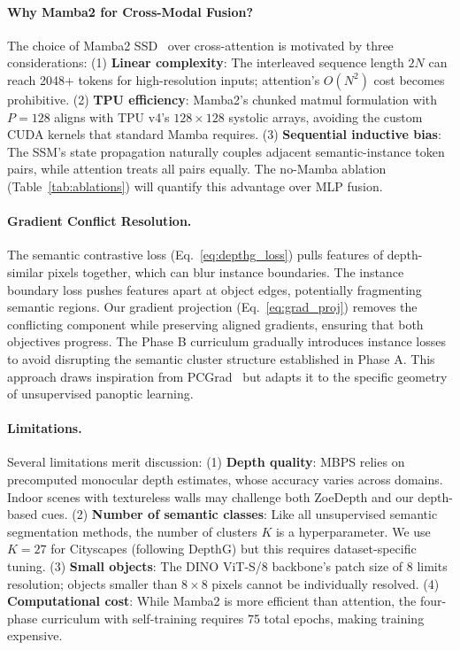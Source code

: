 \documentclass{article}
\begin{document}
\paragraph{Why Mamba2 for Cross-Modal Fusion?}
The choice of Mamba2 SSD~\cite{dao2024mamba2} over cross-attention is motivated by three considerations: (1) \textbf{Linear complexity}: The interleaved sequence length $2N$ can reach 2048+ tokens for high-resolution inputs; attention's $O(N^2)$ cost becomes prohibitive. (2) \textbf{TPU efficiency}: Mamba2's chunked matmul formulation with $P = 128$ aligns with TPU v4's $128 \times 128$ systolic arrays, avoiding the custom CUDA kernels that standard Mamba requires. (3) \textbf{Sequential inductive bias}: The SSM's state propagation naturally couples adjacent semantic-instance token pairs, while attention treats all pairs equally. The no-Mamba ablation (Table~\ref{tab:ablations}) will quantify this advantage over MLP fusion.

\paragraph{Gradient Conflict Resolution.}
The semantic contrastive loss (Eq.~\ref{eq:depthg_loss}) pulls features of depth-similar pixels together, which can blur instance boundaries. The instance boundary loss pushes features apart at object edges, potentially fragmenting semantic regions. Our gradient projection (Eq.~\ref{eq:grad_proj}) removes the conflicting component while preserving aligned gradients, ensuring that both objectives progress. The Phase B curriculum gradually introduces instance losses to avoid disrupting the semantic cluster structure established in Phase A. This approach draws inspiration from PCGrad~\cite{yu2020pcgrad} but adapts it to the specific geometry of unsupervised panoptic learning.

\paragraph{Limitations.}
Several limitations merit discussion: (1) \textbf{Depth quality}: MBPS relies on precomputed monocular depth estimates, whose accuracy varies across domains. Indoor scenes with textureless walls may challenge both ZoeDepth and our depth-based cues. (2) \textbf{Number of semantic classes}: Like all unsupervised semantic segmentation methods, the number of clusters $K$ is a hyperparameter. We use $K = 27$ for Cityscapes (following DepthG) but this requires dataset-specific tuning. (3) \textbf{Small objects}: The DINO ViT-S/8 backbone's patch size of 8 limits resolution; objects smaller than $8 \times 8$ pixels cannot be individually resolved. (4) \textbf{Computational cost}: While Mamba2 is more efficient than attention, the four-phase curriculum with self-training requires 75 total epochs, making training expensive.
\end{document}

